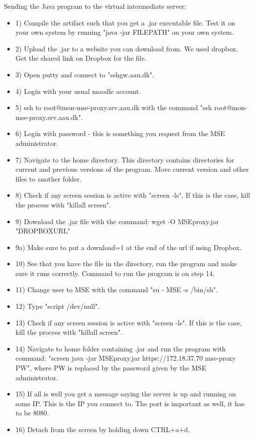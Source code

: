 Sending the Java program to the virtual intermediate server:
\begin{itemize}
\item 1) Compile the artifact such that you get a .jar executable file. Test it on your own system by running "java -jar FILEPATH" on your own system.
\item 2) Upload the .jar to a website you can download from. We used dropbox. Get the shared link on Dropbox for the file.
\item 3) Open putty and connect to "sshgw.aau.dk".
\item 4) Login with your usual moodle account.
\item 5) ssh to root@mon-mse-proxy.srv.aau.dk with the command "ssh root@mon-mse-proxy.srv.aau.dk".
\item 6) Login with password - this is something you request from the MSE administrator.
\item 7) Navigate to the home directory. This directory contains directories for current and previous versions of the program. Move current version and other files to another folder. 
\item 8) Check if any screen session is active with "screen -ls". If this is the case, kill the process with "killall screen".
\item 9) Download the .jar file with the command: wget -O MSEproxy.jar "DROPBOXURL" 
\item 9a) Make sure to put a download=1 at the end of the url if using Dropbox.
\item 10) See that you have the file in the directory, run the program and make sure it runs correctly. Command to run the program is on step 14.
\item 11) Change user to MSE with the command "su - MSE -s /bin/sh".
\item 12) Type "script /dev/null".
\item 13) Check if any screen session is active with "screen -ls". If this is the case, kill the process with "killall screen".
\item 14) Navigate to home folder containing .jar and run the program with command: "screen java -jar MSEproxy.jar https://172.18.37.70 mse-proxy PW", where PW is replaced by the password given by the MSE administrator.
\item 15) If all is well you get a message saying the server is up and running on some IP. This is the IP you connect to. The port is important as well, it has to be 8080.
\item 16) Detach from the screen by holding down CTRL+a+d.
\end{itemize}

